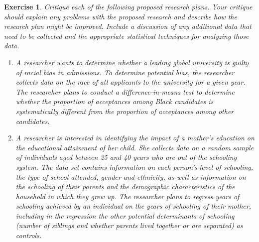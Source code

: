 \documentclass{article}
\newtheorem{exercise}[theorem]{Exercise}
\begin{document}
\begin{exercise} %
Critique each of the following proposed research plans. Your critique should explain any problems with the proposed research and describe how the research plan might be improved. Include a discussion of any additional data that need to be collected and the appropriate statistical techniques for analyzing those data.
    \begin{enumerate}[label=(\alph*)]
        \item A researcher wants to determine whether a leading global university is guilty of racial bias in admissions. To determine potential bias, the researcher collects data on the race of all applicants to the university for a given year. The researcher plans to conduct a difference-in-means test to determine whether the proportion of acceptances among Black candidates is systematically different from the proportion of acceptances among other candidates.
        \item A researcher is interested in identifying the impact of a mother’s education on the educational attainment of her child. She collects data on a random sample of individuals aged between 25 and 40 years who are out of the schooling system. The data set contains information on each person’s level of schooling, the type of school attended, gender and ethnicity, as well as information on the schooling of their parents and the demographic characteristics of the household in which they grew up. The researcher plans to regress years of schooling achieved by an individual on the years of schooling of their mother, including in the regression the other potential determinants of schooling (number of siblings and whether parents lived together or are separated) as controls.
    \end{enumerate}

\end{exercise}
\end{document}
